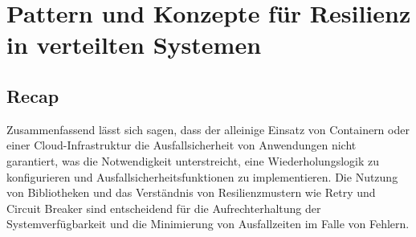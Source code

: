 \section{Pattern und Konzepte für Resilienz in verteilten Systemen}









\subsection{Recap}

Zusammenfassend lässt sich sagen, dass der alleinige Einsatz von Containern
oder einer Cloud-Infrastruktur die Ausfallsicherheit von Anwendungen nicht garantiert,
was die Notwendigkeit unterstreicht, eine Wiederholungslogik zu konfigurieren und Ausfallsicherheitsfunktionen zu implementieren.
Die Nutzung von Bibliotheken und das Verständnis von Resilienzmustern wie Retry und Circuit Breaker
sind entscheidend für die Aufrechterhaltung der Systemverfügbarkeit und die Minimierung von Ausfallzeiten im Falle von Fehlern.
